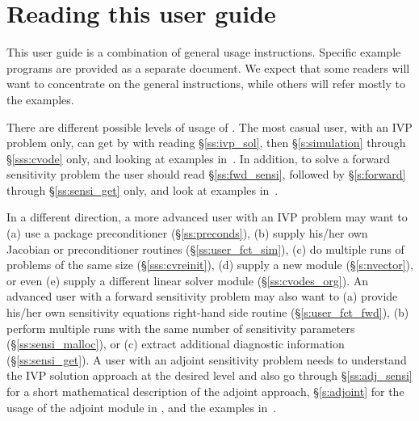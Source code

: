 \section{Reading this user guide}\label{ss:reading}

This user guide is a combination of general usage instructions.
Specific example programs are provided as a separate document.
We expect that some readers will want to concentrate on the general 
instructions, while others will refer mostly to the examples.

There are different possible levels of usage of {\cvodes}. The most casual
user, with an IVP problem only, can get by with reading \S\ref{ss:ivp_sol}, 
then \S\ref{s:simulation} through \S\ref{sss:cvode} only, and looking at examples 
in~\cite{cvodes2.3.0_ex}.
In addition, to solve a forward sensitivity problem the user should read 
\S\ref{ss:fwd_sensi}, followed by \S\ref{s:forward} through 
\S\ref{ss:sensi_get} only, and look at examples in~\cite{cvodes2.3.0_ex}.

In a different direction, a more advanced user with an IVP problem may want to 
(a) use a package preconditioner (\S\ref{ss:preconds}), 
(b) supply his/her own Jacobian or preconditioner routines (\S\ref{ss:user_fct_sim}),
(c) do multiple runs of problems of the same size (\S\ref{sss:cvreinit}), 
(d) supply a new {\nvector} module (\S\ref{s:nvector}), or even 
(e) supply a different linear solver module (\S\ref{ss:cvodes_org}).
%
An advanced user with a forward sensitivity problem may also want to
(a) provide his/her own sensitivity equations right-hand side routine
(\S\ref{s:user_fct_fwd}), (b) perform multiple runs with the same number of
sensitivity parameters (\S\ref{ss:sensi_malloc}), or (c) extract additional
diagnostic information (\S\ref{ss:sensi_get}).
%
A user with an adjoint sensitivity problem needs to understand the IVP 
solution approach at the desired level and also go through 
\S\ref{ss:adj_sensi} for a short mathematical description of the adjoint
approach, \S\ref{s:adjoint} for the usage of the adjoint module in {\cvodes},
and the examples in~\cite{cvodes2.3.0_ex}.

